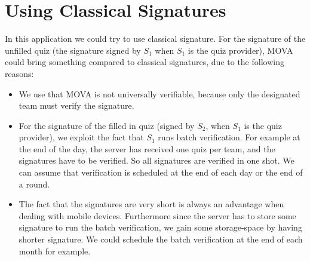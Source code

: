     \section{Using Classical Signatures}
    \label{sec:app-classic}
    In this application we could try to use classical signature. For the signature of the unfilled quiz (the signature signed by $S_1$ when $S_1$ is the quiz provider), 
    MOVA could bring something compared to classical signatures, due to the following reasons:
    \begin{itemize}
        \item We use that MOVA is not universally verifiable, because only the designated team must verify the signature. 
        \item For the signature of the filled in quiz (signed by $S_2$, when $S_1$ is the quiz provider), we exploit the fact that $S_1$
            runs batch verification. For example at the end of the day, the server has received one quiz per team, and the signatures have to be 
            verified. So all signatures are verified in one shot. We can assume that verification is scheduled at the end of each day or the end of a round. 
        \item The fact that the signatures are very short is always an advantage when dealing with mobile devices. Furthermore since the server has to
            store some signature to run the batch verification, we gain some storage-space by having shorter signature. We could schedule the batch verification
            at the end of each month for example.
    \end{itemize}
    


